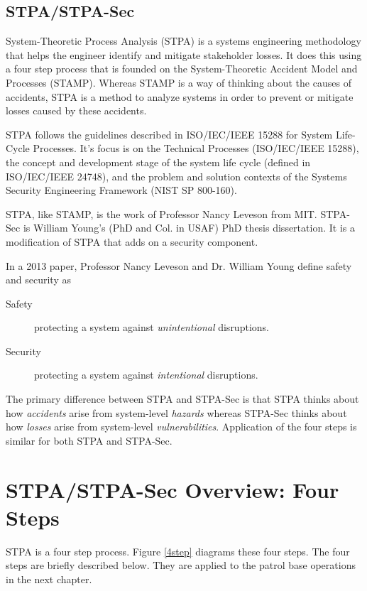 \documentclass[../../main/main.tex]{subfiles}
\begin{document}
\subsection{STPA/STPA-Sec}\label{ssec:stpa}
System-Theoretic Process Analysis (STPA) is a systems engineering methodology that helps the engineer identify and mitigate stakeholder losses. It does this using a four step process that is founded on the System-Theoretic Accident Model and Processes (STAMP).  Whereas STAMP is a way of thinking about the causes of accidents, STPA is a method to analyze systems in order to prevent or mitigate losses caused by these accidents.  

STPA follows the guidelines described in ISO/IEC/IEEE 15288 for System Life-Cycle Processes.  It's focus is on the Technical Processes (ISO/IEC/IEEE 15288), the concept and development stage of the system life cycle (defined in ISO/IEC/IEEE 24748), and the problem and solution contexts of the Systems Security Engineering Framework (NIST SP 800-160).

STPA, like STAMP, is the work of Professor Nancy Leveson from MIT.  STPA-Sec is William Young's (PhD and Col. in USAF) PhD thesis dissertation.  It is a modification of STPA that adds on a security component.  

In a 2013 paper, Professor Nancy Leveson and Dr. William Young define safety and security as
\begin{description}
\item[ Safety ] protecting a system against \textit{unintentional} disruptions.
\item[ Security ] protecting a system against \textit{intentional} disruptions.
\end{description}
The primary difference between STPA and STPA-Sec is that STPA thinks about how \textit{accidents} arise from system-level \textit{hazards} whereas STPA-Sec thinks about how \textit{losses} arise from system-level \textit{vulnerabilities}.  Application of the four steps is similar for both STPA and STPA-Sec.


\section{STPA/STPA-Sec Overview: Four Steps}
STPA is a four step process.  Figure \ref{4step} diagrams these four steps.  The four steps are briefly described below.  They are applied to the patrol base operations in the next chapter. 
\end{document}
